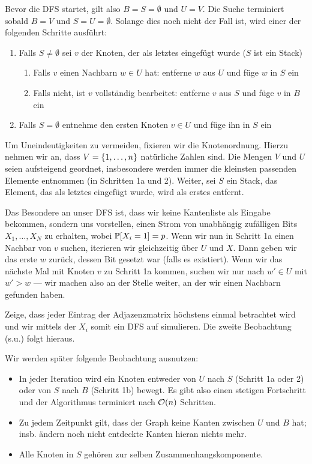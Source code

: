 Bevor die DFS startet, gilt also $B = S = \emptyset$ und $U = V$.
Die Suche terminiert sobald $B = V$ und $S = U = \emptyset$.
Solange dies noch nicht der Fall ist, wird einer der folgenden Schritte ausführt:

\begin{enumerate}
    \item Falls $S \ne \emptyset$ sei $v$ der Knoten, der als letztes eingefügt wurde ($S$ ist ein Stack)
          \begin{enumerate}
              \item Falls $v$ einen Nachbarn $w \in U$ hat: entferne $w$ aus $U$ und füge $w$ in $S$ ein
              \item Falls nicht, ist $v$ vollständig bearbeitet: entferne $v$ aus $S$ und füge $v$ in $B$ ein
          \end{enumerate}
    \item Falls $S = \emptyset$ entnehme den ersten Knoten $v \in U$ und füge ihn in $S$ ein
\end{enumerate}

Um Uneindeutigkeiten zu vermeiden, fixieren wir die Knotenordnung.
Hierzu nehmen wir \oBdA an, dass $V = \left\{1, \ldots, n\right\}$ natürliche Zahlen sind.
Die Mengen $V$ und $U$ seien aufsteigend geordnet, insbesondere werden immer die kleinsten passenden Elemente entnommen (in Schritten 1a und 2).
Weiter, sei $S$ ein Stack, \dh das Element, das als letztes eingefügt wurde, wird als erstes entfernt.

Das Besondere an unser DFS ist, dass wir keine Kantenliste als Eingabe bekommen, sondern uns vorstellen, einen Strom von unabhängig zufälligen Bits $X_1, \ldots, X_N$ zu erhalten, wobei $\mathbb{P}\!\left[X_i = 1\right] = p$.
Wenn wir nun in Schritt 1a einen Nachbar von $v$ suchen, iterieren wir gleichzeitig über $U$ und $X$.
Dann geben wir das erste $w$ zurück, dessen Bit gesetzt war (falls es existiert).
Wenn wir das nächste Mal mit Knoten $v$ zu Schritt 1a kommen, suchen wir nur nach $w' \in U$ mit $w' > w$ --- wir machen also an der Stelle weiter, an der wir einen Nachbarn gefunden haben.

\begin{exercise}
    Zeige, dass jeder Eintrag der Adjazenzmatrix höchstens einmal betrachtet wird und wir mittels der $X_i$ somit ein DFS auf \Gnp simulieren.
    Die zweite Beobachtung (s.u.) folgt hieraus.
\end{exercise}

\noindent
Wir werden später folgende Beobachtung ausnutzen:
\begin{itemize}
    \item In jeder Iteration wird ein Knoten entweder von $U$ nach $S$ (Schritt 1a oder 2) oder von $S$ nach $B$ (Schritt 1b) bewegt.
          Es gibt also einen stetigen Fortschritt und der Algorithmus terminiert nach $\mathcal{O}\!\left(n\right)$ Schritten.
    \item Zu jedem Zeitpunkt gilt, dass der Graph keine Kanten zwischen $U$ und $B$ hat; insb. ändern noch nicht entdeckte Kanten hieran nichts mehr.
    \item Alle Knoten in $S$ gehören zur selben Zusammenhangskomponente.
\end{itemize}

